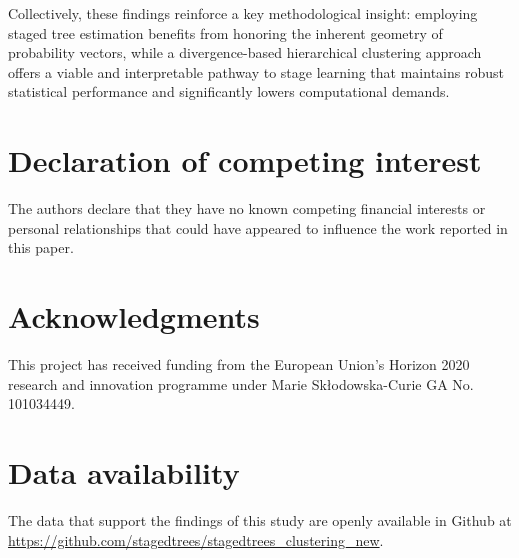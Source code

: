 \documentclass[preprint,12pt]{elsarticle}
\begin{document}
Collectively, these findings reinforce a key methodological insight: employing staged tree estimation benefits from honoring the inherent geometry of probability vectors, while a divergence-based hierarchical clustering approach offers a viable and interpretable pathway to stage learning that maintains robust statistical performance and significantly lowers computational demands. 







\section*{Declaration of competing interest}
The authors declare that they have no known competing financial interests or personal relationships that could have appeared to influence the work reported in this paper.

\section*{Acknowledgments}
This project has received funding from the European Union’s Horizon 2020 research and
innovation programme under Marie Skłodowska-Curie GA No. 101034449.

\section*{Data availability}
The data that support the findings of this study are openly available in Github at \url{https://github.com/stagedtrees/stagedtrees_clustering_new}.
\end{document}

